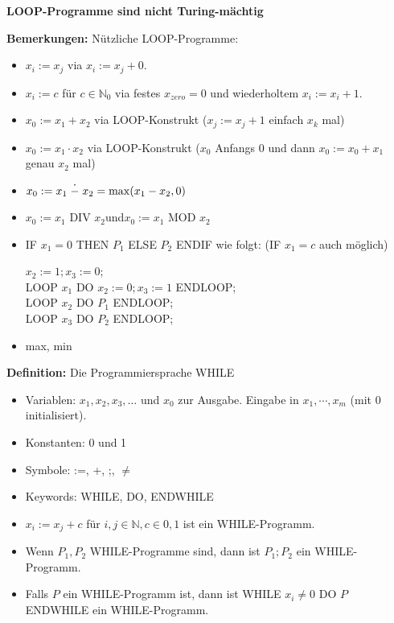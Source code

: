 \documentclass[a4paper,graphics,11pt]{article}
\newcommand{\up}[2]{\mathrel{\overset{\makebox[0pt]{\mbox{\normalfont\tiny #2}}}{#1}}}
\begin{document}
\textbf{LOOP-Programme sind nicht Turing-mächtig}

\strut

\textbf{Bemerkungen:} Nützliche LOOP-Programme:
\begin{itemize}
    \item $x_i := x_j$ via $x_i := x_j + 0$.
    \item $x_i := c$ für $c \in \mathbb{N}_0$ via festes $x_{zero} = 0$ und wiederholtem $x_i := x_i + 1$.
    \item $x_0 := x_1 + x_2$ via LOOP-Konstrukt ($x_j := x_j + 1$ einfach $x_k$ mal)
    \item $x_0 := x_1 \cdot x_2$ via LOOP-Konstrukt ($x_0$ Anfangs 0 und dann $x_0 := x_0 + x_1$ genau $x_2$ mal)
    \item $x_0 := x_1 \up{-}{\large.} x_2 = \max(x_1-x_2,0)$
    \item $x_0 := x_1 \text{ DIV } x_2$\quad und\quad $x_0 := x_1 \text{ MOD } x_2$
    \item IF $x_1 = 0$ THEN $P_1$ ELSE $P_2$ ENDIF wie folgt: (IF $x_1 = c$ auch möglich)

        $x_2 := 1; x_3 := 0$;\\
        LOOP $x_1$ DO $x_2 := 0;x_3 := 1$ ENDLOOP;\\
        LOOP $x_2$ DO $P_1$ ENDLOOP;\\
        LOOP $x_3$ DO $P_2$ ENDLOOP;\\
    \item max, min
\end{itemize}

\newpage

\textbf{Definition:} Die Programmiersprache WHILE
\begin{itemize}
    \item Variablen: $x_1,x_2,x_3,\dots$ und $x_0$ zur Ausgabe.
        Eingabe in $x_1,\cdots,x_m$ (mit 0 initialisiert).
    \item Konstanten: 0 und 1
    \item Symbole: :=, +, ;, {\color{red}$\neq$}
    \item Keywords: WHILE, DO, ENDWHILE
    \\
    \item $x_i := x_j + c$ für $i,j \in \mathbb{N}, c\in {0,1}$ ist ein WHILE-Programm.
    \item Wenn $P_1,P_2$ WHILE-Programme sind, dann ist $P_1;P_2$ ein WHILE-Programm.
    \item Falls $P$ ein WHILE-Programm ist, dann ist WHILE $x_i \neq 0$ DO $P$ ENDWHILE ein WHILE-Programm.
\end{itemize}
\end{document}
